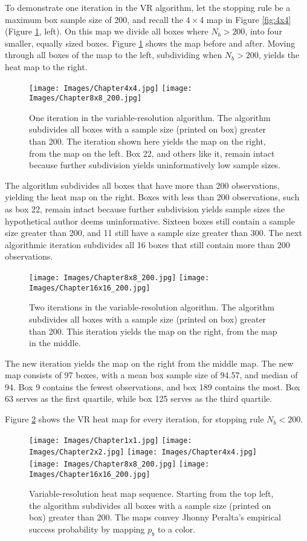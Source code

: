 To demonstrate one iteration in the VR algorithm, let the stopping rule be a maximum box sample size of 200, and recall the $4 \times 4$ map in Figure \ref{fig:4x4} (Figure \ref{fig:4x4and8x8}, left). On this map we divide all boxes where $N_{b} > 200$, into four smaller, equally sized boxes. Figure \ref{fig:4x4and8x8} shows the map before and after. Moving through all boxes of the map to the left, subdividing when $N_{b} > 200$, yields the heat map to the right.
        \begin{figure}[H]
      	\centering
      	\texttt{[image: Images/Chapter4x4.jpg]} 
      	\texttt{[image: Images/Chapter8x8\_200.jpg]} 
      	\caption{One iteration in the variable-resolution algorithm. The algorithm subdivides all boxes with a sample size (printed on box) greater than 200. The iteration shown here yields the map on the right, from the map on the left. Box 22, and others like it, remain intact because further subdivision yields uninformatively low sample sizes.}
      	\label{fig:4x4and8x8}
      	\end{figure} 
The algorithm subdivides all boxes that have more than 200 observations, yielding the heat map on the right. Boxes with less than 200 observations, such as box 22, remain intact because further subdivision yields sample sizes the hypothetical author deems uninformative. Sixteen boxes still contain a sample size greater than 200, and 11 still have a sample size greater than 300. The next algorithmic iteration subdivides all 16 boxes that still contain more than 200 observations. 
        \begin{figure}[H]
      	\centering
      	\texttt{[image: Images/Chapter8x8\_200.jpg]} 
      	\texttt{[image: Images/Chapter16x16\_200.jpg]} 
      	\caption{Two iterations in the variable-resolution algorithm. The algorithm subdivides all boxes with a sample size (printed on box) greater than 200. This iteration yields the map on the right, from the map in the middle.}
      	\end{figure}
The new iteration yields the map on the right from the middle map. The new map consists of 97 boxes, with a mean box sample size of 94.57, and median of 94. Box 9 contains the fewest observations, and box 189 contains the most. Box 63 serves as the first quartile, while box 125 serves as the third quartile. 

Figure \ref{fig:allvr} shows the VR heat map for every iteration, for stopping rule $N_{b} < 200$.
        \begin{figure}[H]
      	\centering
      	\texttt{[image: Images/Chapter1x1.jpg]}
      	\texttt{[image: Images/Chapter2x2.jpg]}
      	\texttt{[image: Images/Chapter4x4.jpg]}
      	\texttt{[image: Images/Chapter8x8\_200.jpg]} 
      	\texttt{[image: Images/Chapter16x16\_200.jpg]} 
      	\caption{Variable-resolution heat map sequence. Starting from the top left, the algorithm subdivides all boxes with a sample size (printed on box) greater than 200. The maps convey Jhonny Peralta's empirical success probability by mapping $p_{b}$ to a color.}
      	\label{fig:allvr}
      	\end{figure}
      	
